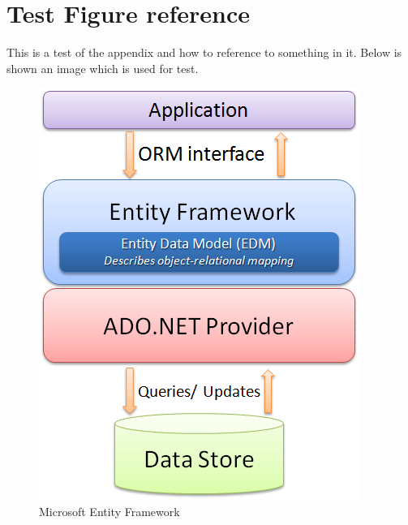 \chapter{Test Figure reference}
\label{appendix:figure}
This is a test of the appendix and how to reference to something in it. 
Below is shown an image which is used for test. 
\begin{figure}[h]
  \centering
 \includegraphics[scale=0.5]{figures/Entity-Framework}
  \caption{Microsoft Entity Framework}
  \label{fig:entityframework}
\end{figure}


